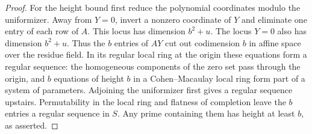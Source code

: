 \documentclass[a4paper,11pt]{article}
\theoremstyle{definition}
\theoremstyle{remark}
\numberwithin{equation}{section}
\begin{document}
\begin{proof}
For the height bound first reduce the polynomial coordinates
modulo the uniformizer. Away from \(Y=0\), invert a nonzero
coordinate of \(Y\) and eliminate one entry of each row of
\(A\). This locus has dimension \(b^2+u\). The locus
\(Y=0\) also has dimension \(b^2+u\). Thus the \(b\)
entries of \(AY\) cut out codimension \(b\) in affine
space over the residue field. In its regular local ring
at the origin these equations form a regular sequence:
the homogeneous components of the zero set pass through
the origin, and \(b\) equations of height \(b\) in a
Cohen--Macaulay local ring form part of a system of
parameters. Adjoining the uniformizer first gives a regular
sequence upstairs. Permutability in the local ring and
flatness of completion leave the \(b\) entries a regular
sequence in \(S\). Any prime containing them has height
at least \(b\), as asserted.
\end{proof}
\end{document}
